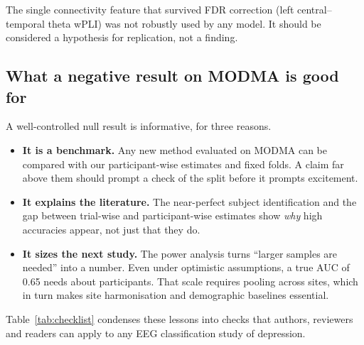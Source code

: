 The single connectivity feature that survived FDR correction (left central--temporal theta wPLI) was not robustly
used by any model. It should be considered a hypothesis for replication, not a finding.

\subsection{What a negative result on MODMA is good for}
A well-controlled null result is informative, for three reasons.
\begin{itemize}
  \item \textbf{It is a benchmark.} Any new method evaluated on MODMA can be compared with our participant-wise
        estimates and fixed folds. A claim far above them should prompt a check of the split before it prompts
        excitement.
  \item \textbf{It explains the literature.} The near-perfect subject identification and the gap between
        trial-wise and participant-wise estimates show \emph{why} high accuracies appear, not just that they do.
  \item \textbf{It sizes the next study.} The power analysis turns ``larger samples are needed'' into a number.
        Even under optimistic assumptions, a true AUC of 0.65 needs about \AudNNeedSixtyFive{} participants. That
        scale requires pooling across sites, which in turn makes site harmonisation and demographic baselines
        essential.
\end{itemize}
Table~\ref{tab:checklist} condenses these lessons into checks that authors, reviewers and readers can apply to any
EEG classification study of depression.

